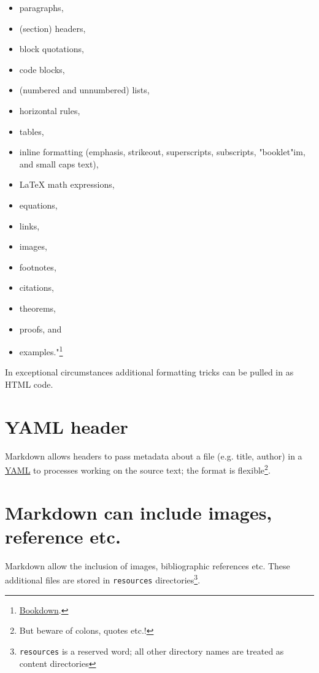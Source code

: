 \documentclass{tufte-book}
\begin{document}
\begin{itemize}
	\item
	paragraphs,
	\item
	(section) headers,
	\item
	block quotations,
	\item
	code blocks,
	\item
	(numbered and unnumbered) lists,
	\item
	horizontal rules,
	\item
	tables,
	\item
	inline formatting (emphasis, strikeout, superscripts, subscripts,
	"booklet"im, and small caps text),
	\item
	LaTeX math expressions,
	\item
	equations,
	\item
	links,
	\item
	images,
	\item
	footnotes,
	\item
	citations,
	\item
	theorems,
	\item
	proofs, and
	\item
	examples."\footnote{\href{https://bookdown.org/yihui/rmarkdown/\#preface}{Bookdown}.}
\end{itemize}

In exceptional circumstances additional formatting tricks can be pulled
in as HTML code.

\hypertarget{yaml-header}{%
	\section{YAML header}\label{yaml-header}}

Markdown allows headers to pass metadata about a file (e.g. title,
author) in a \href{https://yaml.org/spec/1.2.2/}{YAML} to processes
working on the source text; the format is flexible\footnote{But beware
	of colons, quotes etc.!}.

\hypertarget{markdown-can-include-images-reference-etc}{%
	\section{Markdown can include images, reference
		etc.}\label{markdown-can-include-images-reference-etc}}

Markdown allow the inclusion of images, bibliographic references etc.
These additional files are stored in \texttt{resources}
directories\footnote{\texttt{resources} is a reserved word; all other
	directory names are treated as content directories}.
\end{document}
